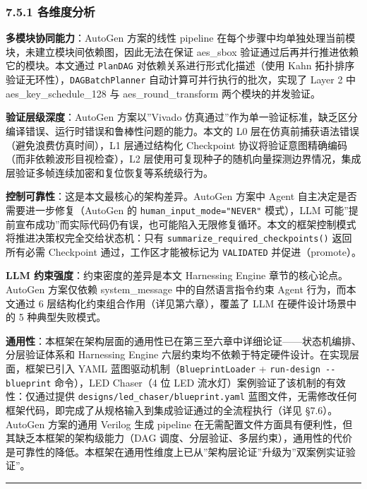 \subsubsection{7.5.1 各维度分析}\label{ux5404ux7ef4ux5ea6ux5206ux6790}

\textbf{多模块协同能力}：AutoGen 方案的线性 pipeline
在每个步骤中均单独处理当前模块，未建立模块间依赖图，因此无法在保证
aes\_sbox 验证通过后再并行推进依赖它的模块。本文通过 \texttt{PlanDAG}
对依赖关系进行形式化描述（使用 Kahn
拓扑排序验证无环性），\texttt{DAGBatchPlanner}
自动计算可并行执行的批次，实现了 Layer 2 中 aes\_key\_schedule\_128 与
aes\_round\_transform 两个模块的并发验证。

\textbf{验证层级深度}：AutoGen 方案以''Vivado
仿真通过''作为单一验证标准，缺乏区分编译错误、运行时错误和鲁棒性问题的能力。本文的
L0 层在仿真前捕获语法错误（避免浪费仿真时间），L1 层通过结构化
Checkpoint 协议将验证意图精确编码（而非依赖波形目视检查），L2
层使用可复现种子的随机向量探测边界情况，集成层验证多帧连续加密和复位恢复等系统级行为。

\textbf{控制可靠性}：这是本文最核心的架构差异。AutoGen 方案中 Agent
自主决定是否需要进一步修复（AutoGen 的
\texttt{human\_input\_mode="NEVER"} 模式），LLM
可能''提前宣布成功''而实际代码仍有误，也可能陷入无限修复循环。本文的框架控制模式将推进决策权完全交给状态机：只有
\texttt{summarize\_required\_checkpoints()} 返回所有必需 Checkpoint
通过，工作区才能被标记为 \texttt{VALIDATED} 并促进（promote）。

\textbf{LLM 约束强度}：约束密度的差异是本文 Harnessing Engine
章节的核心论点。AutoGen 方案仅依赖 system\_message 中的自然语言指令约束
Agent 行为，而本文通过 6 层结构化约束组合作用（详见第六章），覆盖了 LLM
在硬件设计场景中的 5 种典型失败模式。

\textbf{通用性}：本框架在架构层面的通用性已在第三至六章中详细论证------状态机编排、分层验证体系和
Harnessing Engine 六层约束均不依赖于特定硬件设计。在实现层面，框架已引入
YAML 蓝图驱动机制（\texttt{BlueprintLoader} +
\texttt{run-design\ -\/-blueprint} 命令），LED Chaser（4 位 LED
流水灯）案例验证了该机制的有效性：仅通过提供
\texttt{designs/led\_chaser/blueprint.yaml}
蓝图文件，无需修改任何框架代码，即完成了从规格输入到集成验证通过的全流程执行（详见
§7.6）。AutoGen 方案的通用 Verilog 生成 pipeline
在无需配置文件方面具有便利性，但其缺乏本框架的架构级能力（DAG
调度、分层验证、多层约束），通用性的代价是可靠性的降低。本框架在通用性维度上已从''架构层论证''升级为''双案例实证验证''。

\begin{center}\rule{0.5\linewidth}{0.5pt}\end{center}

